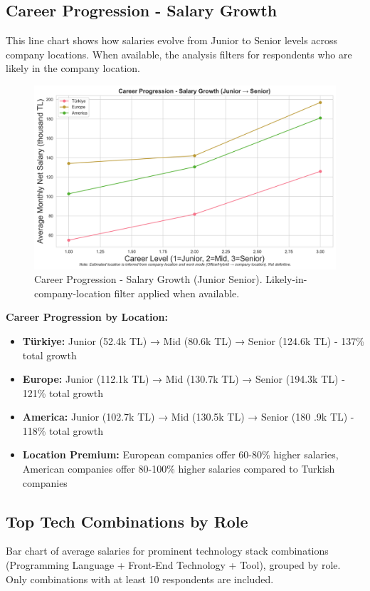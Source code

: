 \documentclass[12pt,a4paper]{article}
\begin{document}
\subsection{Career Progression - Salary Growth}
This line chart shows how salaries evolve from Junior to Senior levels across company locations. When available, the analysis filters for respondents who are likely in the company location.

\begin{figure}[H]
    \centering
    \includegraphics[width=\textwidth]{figures/line_career_progression_salary_growth.png}
    \caption{Career Progression - Salary Growth (Junior \textrightarrow{} Senior). Likely-in-company-location filter applied when available.}

\end{figure}

\textbf{Career Progression by Location:}
\begin{itemize}
    \item \textbf{Türkiye:} Junior (52.4k TL) → Mid (80.6k TL) → Senior (124.6k TL) - 137\% total growth
    \item \textbf{Europe:} Junior (112.1k TL) → Mid (130.7k TL) → Senior (194.3k TL) - 121\% total growth
    \item \textbf{America:} Junior (102.7k TL) → Mid (130.5k TL) → Senior (180 .9k TL) - 118\% total growth
    \item \textbf{Location Premium:} European companies offer 60-80\% higher salaries, American companies offer 80-100\% higher salaries compared to Turkish companies
\end{itemize}

\subsection{Top Tech Combinations by Role}
Bar chart of average salaries for prominent technology stack combinations (Programming Language + Front-End Technology + Tool), grouped by role. Only combinations with at least 10 respondents are included.
\end{document}
